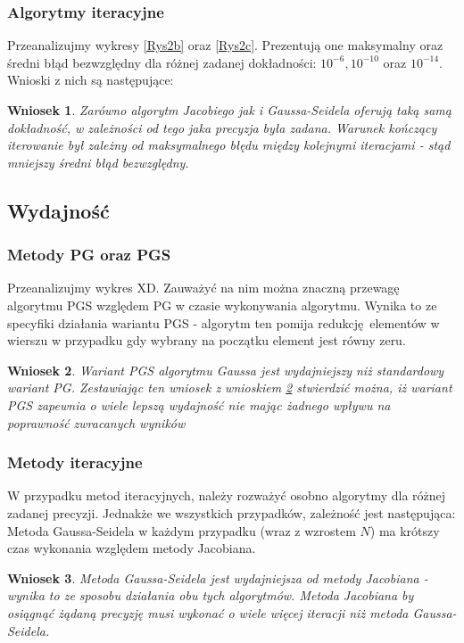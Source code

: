 \documentclass[10pt]{article}
\newtheorem{wn}{Wniosek}
\begin{document}
\subsubsection{Algorytmy iteracyjne}
Przeanalizujmy wykresy \ref{Rys2b} oraz \ref{Rys2c}. Prezentują one maksymalny oraz średni błąd bezwzględny dla różnej zadanej dokładności: $10^{-6},10^{-10}$ oraz $10^{-14}$.
Wnioski z nich są następujące:
\begin{wn}
	Zarówno algorytm Jacobiego jak i Gaussa-Seidela oferują taką samą dokładność, w zależności od tego jaka precyzja była zadana. Warunek kończący iterowanie był zależny od maksymalnego błędu między kolejnymi iteracjami - stąd mniejszy średni błąd bezwzględny. \label{wn:2}
\end{wn}
\subsection{Wydajność}
\subsubsection{Metody PG oraz PGS}
Przeanalizujmy wykres XD. Zauważyć na nim można znaczną przewagę algorytmu PGS względem PG w czasie wykonywania algorytmu. Wynika to ze specyfiki działania wariantu PGS - algorytm ten pomija redukcję elementów w wierszu w przypadku gdy wybrany na początku element jest równy zeru.
\begin{wn}
	Wariant PGS algorytmu Gaussa jest wydajniejszy niż standardowy wariant PG. Zestawiając ten wniosek z wnioskiem \ref{wn:3} stwierdzić można, iż wariant PGS zapewnia o wiele lepszą wydajność nie mając żadnego wpływu na poprawność zwracanych wyników
	 \label{wn:3}
\end{wn}
\subsubsection{Metody iteracyjne}
W przypadku metod iteracyjnych, należy rozważyć osobno algorytmy dla różnej zadanej precyzji.
Jednakże we wszystkich przypadków, zależność jest następująca: Metoda Gaussa-Seidela w każdym przypadku (wraz z wzrostem $N$) ma krótszy czas wykonania względem metody Jacobiana.
\begin{wn}
	Metoda Gaussa-Seidela jest wydajniejsza od metody Jacobiana - wynika to ze sposobu działania obu tych algorytmów. Metoda Jacobiana by osiągnąć żądaną precyzję musi wykonać o wiele więcej iteracji niż metoda Gaussa-Seidela. \label{wn:4}
\end{wn}
\end{document}
